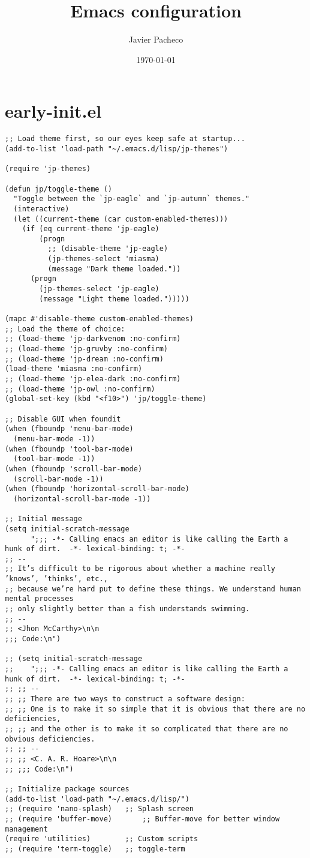 \documentclass[11pt]{article}
\author{Javier Pacheco}
\date{\today}
\title{Emacs configuration}
\begin{document}
\maketitle
\tableofcontents


\section{early-init.el}
\label{sec:org2c88063}
\begin{verbatim}
;; Load theme first, so our eyes keep safe at startup...
(add-to-list 'load-path "~/.emacs.d/lisp/jp-themes")

(require 'jp-themes)

(defun jp/toggle-theme ()
  "Toggle between the `jp-eagle` and `jp-autumn` themes."
  (interactive)
  (let ((current-theme (car custom-enabled-themes)))
    (if (eq current-theme 'jp-eagle)
        (progn
          ;; (disable-theme 'jp-eagle)
          (jp-themes-select 'miasma)
          (message "Dark theme loaded."))
      (progn
        (jp-themes-select 'jp-eagle)
        (message "Light theme loaded.")))))

(mapc #'disable-theme custom-enabled-themes)
;; Load the theme of choice:
;; (load-theme 'jp-darkvenom :no-confirm)
;; (load-theme 'jp-gruvby :no-confirm)
;; (load-theme 'jp-dream :no-confirm)
(load-theme 'miasma :no-confirm)
;; (load-theme 'jp-elea-dark :no-confirm)
;; (load-theme 'jp-owl :no-confirm)
(global-set-key (kbd "<f10>") 'jp/toggle-theme)

;; Disable GUI when foundit
(when (fboundp 'menu-bar-mode)
  (menu-bar-mode -1))
(when (fboundp 'tool-bar-mode)
  (tool-bar-mode -1))
(when (fboundp 'scroll-bar-mode)
  (scroll-bar-mode -1))
(when (fboundp 'horizontal-scroll-bar-mode)
  (horizontal-scroll-bar-mode -1))

;; Initial message
(setq initial-scratch-message
      ";;; -*- Calling emacs an editor is like calling the Earth a hunk of dirt.  -*- lexical-binding: t; -*-
;; --
;; It’s difficult to be rigorous about whether a machine really ’knows’, ’thinks’, etc.,
;; because we’re hard put to define these things. We understand human mental processes
;; only slightly better than a fish understands swimming.
;; --
;; <Jhon McCarthy>\n\n
;;; Code:\n")

;; (setq initial-scratch-message
;; 	  ";;; -*- Calling emacs an editor is like calling the Earth a hunk of dirt.  -*- lexical-binding: t; -*-
;; ;; --
;; ;; There are two ways to construct a software design:
;; ;; One is to make it so simple that it is obvious that there are no deficiencies,
;; ;; and the other is to make it so complicated that there are no obvious deficiencies.
;; ;; --
;; ;; <C. A. R. Hoare>\n\n
;; ;;; Code:\n")

;; Initialize package sources
(add-to-list 'load-path "~/.emacs.d/lisp/")
;; (require 'nano-splash)	;; Splash screen
;; (require 'buffer-move)   	;; Buffer-move for better window management
(require 'utilities)		;; Custom scripts
;; (require 'term-toggle)	;; toggle-term

\end{verbatim}
\end{document}
